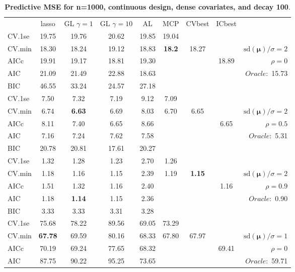 \clearpage
\begin{table}\vspace{-.5cm}
\caption[l]{ { \bf Predictive MSE for n=1000, continuous design, 
dense covariates, and  decay  100}.}
\vspace{-.5cm}
\footnotesize{}
\begin{center}
\begin{tabular}{l*{7}{c}|r}
 & lasso & GL $\gamma=1$ & GL $\gamma=10$ & AL & MCP  & CVbest & ICbest  \\
\cline{1-9}
CV.1se & 19.75 & 19.76 & 20.62 & 19.85 & 19.04 & & & \\
CV.min & 18.30 & 18.24 & 19.12 & 18.83 & {\bf 18.2} & 18.27 & & $\mathrm{sd}(\mathbf{\mu})/\sigma=2$ \\
AICc & 19.91 & 19.17 & 18.81 & 19.30 & & & 18.89 &  $\rho=0$ \\
AIC & 21.09 & 21.49 & 22.88 & 18.63 & & & &  \multirow{2}{*}{$Oracle: $ 15.73} \\
BIC & 46.55 & 33.24 & 24.57 & 27.18 & & & &  \\
 \hline 
CV.1se & 7.50 & 7.32 & 7.19 & 9.12 & 7.09 & & & \\
CV.min & 6.74 & {\bf 6.63} & 6.69 & 8.03 & 6.70 & 6.65 & & $\mathrm{sd}(\mathbf{\mu})/\sigma=2$ \\
AICc & 8.11 & 7.40 & 6.65 & 8.66 & & & 6.65 &  $\rho=0.5$ \\
AIC & 7.16 & 7.24 & 7.62 & 7.58 & & & &  \multirow{2}{*}{$Oracle: $ 5.31} \\
BIC & 20.78 & 20.81 & 17.61 & 20.27 & & & &  \\
 \hline 
CV.1se & 1.32 & 1.28 & 1.23 & 2.70 & 1.26 & & & \\
CV.min & 1.18 & 1.16 & 1.15 & 2.39 & 1.19 & {\bf 1.15} & & $\mathrm{sd}(\mathbf{\mu})/\sigma=2$ \\
AICc & 1.51 & 1.32 & 1.16 & 2.40 & & & 1.16 &  $\rho=0.9$ \\
AIC & 1.18 & {\bf 1.14} & 1.15 & 2.36 & & & &  \multirow{2}{*}{$Oracle: $ 0.90} \\
BIC & 3.33 & 3.33 & 3.31 & 3.28 & & & &  \\
 \hline 
CV.1se & 75.68 & 78.22 & 89.56 & 69.05 & 73.29 & & & \\
CV.min & {\bf 67.78} & 69.59 & 80.16 & 68.33 & 67.80 & 67.97 & & $\mathrm{sd}(\mathbf{\mu})/\sigma=1$ \\
AICc & 70.19 & 69.24 & 77.65 & 68.32 & & & 69.41 &  $\rho=0$ \\
AIC & 87.75 & 90.22 & 95.25 & 73.65 & & & &  \multirow{2}{*}{$Oracle: $ 59.71} \\

\end{tabular}
\end{center}
\end{table}
